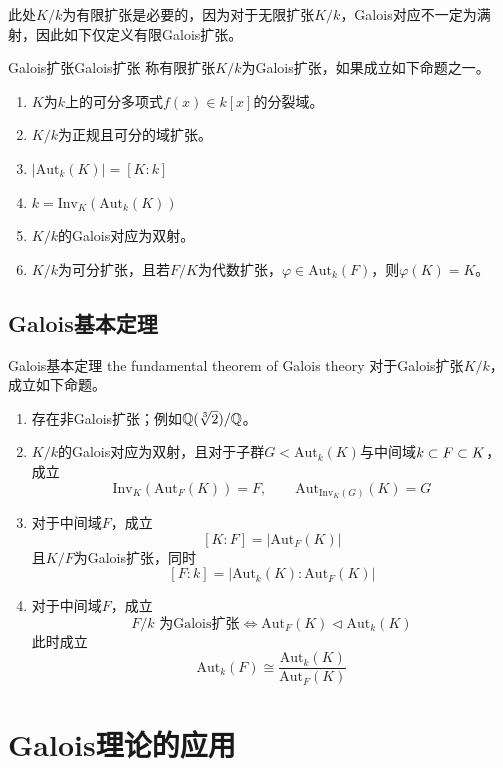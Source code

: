 \begin{remark}
	此处$K/k$为有限扩张是必要的，因为对于无限扩张$K/k$，Galois对应不一定为满射，因此如下仅定义有限Galois扩张。
\end{remark}

\begin{definition}{Galois扩张}{Galois扩张}
	称有限扩张$K/k$为Galois扩张，如果成立如下命题之一。
	\begin{enumerate}
		\item $K$为$k$上的可分多项式$f(x)\in k[x]$的分裂域。
		\item $K/k$为正规且可分的域扩张。
		\item $|\text{Aut}_k(K)|=[K:k]$
		\item $k=\text{Inv}_K(\text{Aut}_k(K))$
		\item $K/k$的Galois对应为双射。
		\item $K/k$为可分扩张，且若$F/K$为代数扩张，$\varphi\in\text{Aut}_k(F)$，则$\varphi(K)=K$。
	\end{enumerate}
\end{definition}

\subsection{Galois基本定理}

\begin{theorem}{Galois基本定理 the fundamental theorem of Galois theory}
	对于Galois扩张$K/k$，成立如下命题。
	\begin{enumerate}
		\item 存在非Galois扩张；例如$\mathbb{Q}(\sqrt[3]{2})/\mathbb{Q}$。
		\item $K/k$的Galois对应为双射，且对于子群$G<\text{Aut}_k(K)$与中间域$k\subset F \subset K$，成立
		$$
		\text{Inv}_K(\text{Aut}_F(K))=F,\qquad 
		\text{Aut}_{\text{Inv}_K(G)}(K)=G
		$$
		\item 对于中间域$F$，成立%
		$$
		[K:F]=|\text{Aut}_F(K)|
		$$
		且$K/F$为Galois扩张，同时
		$$
		[F:k]=|\text{Aut}_k(K):\text{Aut}_F(K)|
		$$
		\item 对于中间域$F$，成立%
		$$
		F/k\text{ 为Galois扩张}\iff
		\text{Aut}_F(K)\lhd \text{Aut}_k(K)
		$$
		此时成立%
		$$
		\text{Aut}_k(F)\cong\frac{\text{Aut}_k(K)}{\text{Aut}_F(K)}
		$$
	\end{enumerate}
\end{theorem}

\section{Galois理论的应用}


